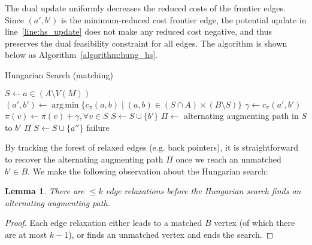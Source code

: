 \documentclass[11pt]{article}
\DeclareMathOperator*{\argmin}{arg\,min}
\theoremstyle{plain}
\newtheorem{lemma}{Lemma}
\begin{document}
The dual update uniformly decreases the reduced costs of the frontier edges.
Since $(a', b')$ is the minimum-reduced cost frontier edge, the potential 
update in line~\ref{line:hs_update} does not make any reduced cost negative, 
and thus preserves the dual feasibility constraint for all edges.
The algorithm is shown below as Algorithm~\ref{algorithm:hung_hs}.

\begin{algorithm}
\caption{Hungarian Search (matching)}
\label{algorithm:hung_hs}
\begin{algorithmic}[1]
\Statex %
	\State $S \gets a \in (A \setminus V(M))$
	\Repeat
		\State $(a', b') \gets \argmin\{c_\pi(a, b) \mid (a, b) \in (S \cap A) \times (B \setminus S)\}$
		\State $\gamma \gets c_\pi(a', b')$
		\State $\pi(v) \gets \pi(v) + \gamma, \forall v \in S$
			\label{line:hs_update}
		\State $S \gets S \cup \{b'\}$
		\Statex %
		 
			\State $\Pi \gets$ alternating augmenting path in $S$ to $b'$
			\State\Return $\Pi$
		\Else {}
			\State $S \gets S \cup \{a''\}$
		\EndIf
	\State\Return failure
\EndFunction
\end{algorithmic}
\end{algorithm}

By tracking the forest of relaxed edges (e.g. back pointers), it is 
straightforward to recover the alternating augmenting path $\Pi$ once we reach 
an unmatched $b' \in B$.
We make the following observation about the Hungarian search:

\begin{lemma}
\label{lemma:hungsearch_length}
	There are $\leq k$ edge relaxations before the Hungarian search finds 
	an alternating augmenting path.
\end{lemma}
\begin{proof}
	Each edge relaxation either leads to a matched $B$ vertex (of which 
	there are at most $k-1$), or finds an unmatched vertex and ends the 
	search.
\end{proof}
\end{document}
